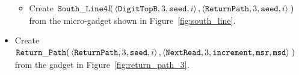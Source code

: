 \begin{itemize}
\begin{itemize}
        \item Create
        $\begin{aligned}[t]
            {\tt South\_Line4\textit{l}}(&\left\langle {\tt DigitTopB},  3, {\tt seed}, i \right\rangle,
                                          \left\langle {\tt ReturnPath}, 3, {\tt seed}, i \right\rangle \;)
        \end{aligned}$\\from the micro-gadget shown in Figure~\ref{fig:south_line}.
    \end{itemize}

    \item Create
    $\begin{aligned}[t]
        {\tt Return\_Path}(&\left\langle {\tt ReturnPath}, 3, {\tt seed}, i                        \right\rangle,
                     \left\langle {\tt NextRead},   3, {\tt increment}, {\tt msr}, {\tt msd}\right\rangle \;)
    \end{aligned}$\\from the gadget in Figure~\ref{fig:return_path_3}.
\end{itemize}




